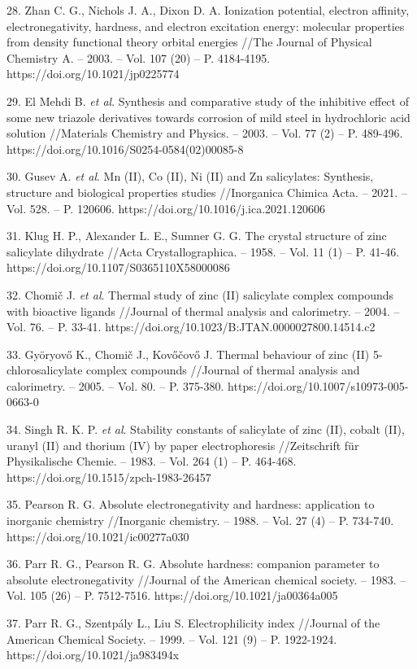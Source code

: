 \begin{noparindent}
28.
  Zhan C. G., Nichols J. A., Dixon D. A. Ionization potential, electron
  affinity, electronegativity, hardness, and electron excitation energy:
  molecular properties from density functional theory orbital energies
  //The Journal of Physical Chemistry A. -- 2003. -- Vol. 107 (20) -- P.
  4184-4195. https://doi.org/10.1021/jp0225774

29.
  El Mehdi B. \emph{et al}. Synthesis and comparative study of the
  inhibitive effect of some new triazole derivatives towards corrosion
  of mild steel in hydrochloric acid solution //Materials Chemistry and
  Physics. -- 2003. -- Vol. 77 (2) -- P. 489-496.
  https://doi.org/10.1016/S0254-0584(02)00085-8

30.
  Gusev A. \emph{et al}. Mn (II), Co (II), Ni (II) and Zn salicylates:
  Synthesis, structure and biological properties studies //Inorganica
  Chimica Acta. -- 2021. -- Vol. 528. -- P. 120606.
  https://doi.org/10.1016/j.ica.2021.120606

31.
  Klug H. P., Alexander L. E., Sumner G. G. The crystal structure of
  zinc salicylate dihydrate //Acta Crystallographica. -- 1958. -- Vol.
  11 (1) -- P. 41-46. https://doi.org/10.1107/S0365110X58000086

32.
  Chomič J. \emph{et al}. Thermal study of zinc (II) salicylate complex
  compounds with bioactive ligands //Journal of thermal analysis and
  calorimetry. -- 2004. -- Vol. 76. -- P. 33-41.
  https://doi.org/10.1023/B:JTAN.0000027800.14514.c2

33.
  Györyovő K., Chomič J., Kovőčovő J. Thermal behaviour of zinc (II)
  5-chlorosalicylate complex compounds //Journal of thermal analysis and
  calorimetry. -- 2005. -- Vol. 80. -- P. 375-380.
  https://doi.org/10.1007/s10973-005-0663-0

34.
  Singh R. K. P. \emph{et al}. Stability constants of salicylate of zinc
  (II), cobalt (II), uranyl (II) and thorium (IV) by paper
  electrophoresis //Zeitschrift für Physikalische Chemie. -- 1983. --
  Vol. 264 (1) -- P. 464-468. https://doi.org/10.1515/zpch-1983-26457

35.
  Pearson R. G. Absolute electronegativity and hardness: application to
  inorganic chemistry //Inorganic chemistry. -- 1988. -- Vol. 27 (4) --
  P. 734-740. https://doi.org/10.1021/ic00277a030

36.
  Parr R. G., Pearson R. G. Absolute hardness: companion parameter to
  absolute electronegativity //Journal of the American chemical society.
  -- 1983. -- Vol. 105 (26) -- P. 7512-7516.
  https://doi.org/10.1021/ja00364a005

37.
  Parr R. G., Szentpály L., Liu S. Electrophilicity index //Journal of
  the American Chemical Society. -- 1999. -- Vol. 121 (9) -- P.
  1922-1924. https://doi.org/10.1021/ja983494x
\end{noparindent}

